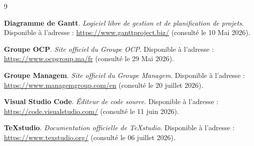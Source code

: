 \adjustmtc
\renewcommand\bibname{Bibliographie}
\begin{thebibliography}{9}
	\thispagestyle{MyStyle}
	
	\textbf{Diagramme de Gantt}.
	\emph{Logiciel libre de gestion et de planification de projets}.
	Disponible à l'adresse :
	\url{https://www.ganttproject.biz/}
	(consulté le 10 Mai 2026).
	
	\textbf{Groupe OCP}.
	\emph{Site officiel du Groupe OCP}.
	Disponible à l'adresse :
	\url{https://www.ocpgroup.ma/fr}
	(consulté le 29 Mai 2026).
	
	\textbf{Groupe Managem}.
	\emph{Site officiel du Groupe Managem}.
	Disponible à l'adresse :
	\url{https://www.managemgroup.com/en}
	(consulté le 20 juillet 2026).
	
	\textbf{Visual Studio Code}.
	\emph{Éditeur de code source}.
	Disponible à l'adresse :
	\url{https://code.visualstudio.com/}
	(consulté le 11 juin 2026).
	
	\textbf{TeXstudio}.
	\emph{Documentation officielle de TeXstudio}.
	Disponible à l'adresse :
	\url{https://www.texstudio.org/}
	(consulté le 06 juillet 2026).
	
\end{thebibliography}

